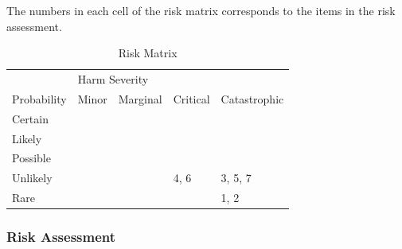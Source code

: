 \documentclass[12pt]{article}
\begin{document}
The numbers in each cell of the risk matrix corresponds to the items in the risk assessment. 

\begin{table}[H]
\centering
\begin{tabular}{l|llll}
                              & \multicolumn{4}{l}{Harm Severity}                                                                                                                                                             \\
\multirow{-2}{*}{Probability} & \multicolumn{1}{l|}{Minor}                    & \multicolumn{1}{l|}{Marginal}                 & \multicolumn{1}{l|}{Critical}                 & \multicolumn{1}{l|}{Catastrophic}             \\ \hline
Certain                       & \multicolumn{1}{l|}{\cellcolor[HTML]{FE996B}} & \multicolumn{1}{l|}{\cellcolor[HTML]{FE996B}} & \multicolumn{1}{l|}{\cellcolor[HTML]{FD6864}} & \multicolumn{1}{l|}{\cellcolor[HTML]{FD6864}} \\ \hline
Likely                        & \multicolumn{1}{l|}{\cellcolor[HTML]{FFFE65}} & \multicolumn{1}{l|}{\cellcolor[HTML]{FE996B}} & \multicolumn{1}{l|}{\cellcolor[HTML]{FE996B}} & \multicolumn{1}{l|}{\cellcolor[HTML]{FD6864}} \\ \hline
Possible                      & \multicolumn{1}{l|}{\cellcolor[HTML]{67FD9A}} & \multicolumn{1}{l|}{\cellcolor[HTML]{FFFE65}} & \multicolumn{1}{l|}{\cellcolor[HTML]{FE996B}} & \multicolumn{1}{l|}{\cellcolor[HTML]{FD6864}} \\ \hline
Unlikely                      & \multicolumn{1}{l|}{\cellcolor[HTML]{67FD9A}} & \multicolumn{1}{l|}{\cellcolor[HTML]{FFFE65}} & \multicolumn{1}{l|}{4, 6\cellcolor[HTML]{FFFE65}} & \multicolumn{1}{l|}{3, 5, 7\cellcolor[HTML]{FE996B}} \\ \hline
Rare                          & \multicolumn{1}{l|}{\cellcolor[HTML]{67FD9A}} & \multicolumn{1}{l|}{\cellcolor[HTML]{67FD9A}} & \multicolumn{1}{l|}{\cellcolor[HTML]{FFFE65}} & \multicolumn{1}{l|}{1, 2\cellcolor[HTML]{FFFE65}} \\ \hline
\end{tabular}
\caption{Risk Matrix}
\label{tab:risk-matrix}
\end{table}


\subsubsection{Risk Assessment}
\end{document}
